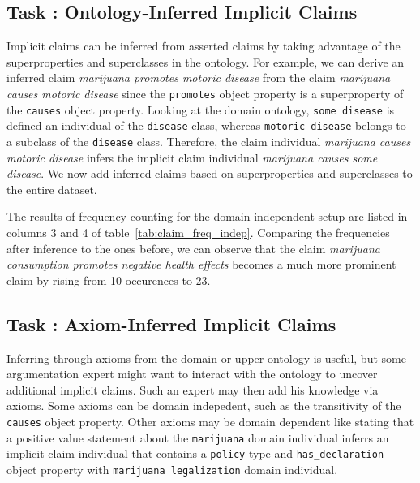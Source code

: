 \subsection{Task : Ontology-Inferred Implicit Claims}

Implicit claims can be inferred from asserted claims by taking advantage
of the superproperties and superclasses in the ontology. 
For example, we can derive an inferred claim
\emph{marijuana promotes motoric disease} from the claim 
\emph{marijuana causes motoric disease}
since the \texttt{promotes} object property is a superproperty of the
\texttt{causes} object property. 
Looking at the domain ontology, \texttt{some disease} is defined an individual 
of the \texttt{disease} class, whereas \texttt{motoric disease} belongs to a 
subclass of the \texttt{disease} class.
Therefore, the claim individual \emph{marijuana causes motoric disease}
infers the implicit claim individual \emph{marijuana causes some disease}. 
We now add inferred claims based on superproperties and 
superclasses to the entire dataset. 

The results of frequency counting for the domain independent setup 
are listed in columns 3 and 4 of table~\ref{tab:claim_freq_indep}. 
Comparing the frequencies after inference to the ones before, we can observe
that the claim \emph{marijuana consumption promotes negative health effects}
becomes a much more prominent claim by rising from 10 occurences to 23.

\subsection{Task : Axiom-Inferred Implicit Claims}

Inferring through axioms from the domain or upper ontology is useful, 
but some argumentation expert might want to interact with the ontology to
uncover additional implicit claims. Such an expert may then 
add his knowledge via axioms. Some axioms can be domain 
indepedent, such as the transitivity of the \texttt{causes} object property.
Other axioms may be domain dependent like stating
that a positive value statement about the \texttt{marijuana} domain 
individual inferrs an implicit claim individual that contains
 a \texttt{policy} type and \texttt{has\_declaration} 
 object property with \texttt{marijuana legalization} domain individual.

